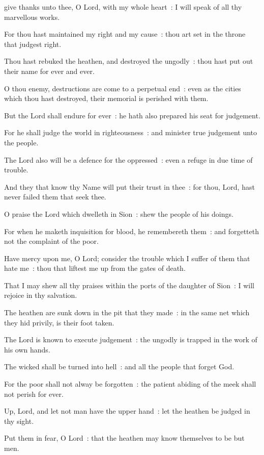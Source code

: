 give thanks unto thee, O Lord, with my whole heart~: I will speak of all thy marvellous works.\par
{}
For thou hast maintained my right and my cause~: thou art set in the throne that judgest right.\par
{}Thou hast rebuked the heathen, and destroyed the ungodly~: thou hast put out their name for ever and ever.\par
{}O thou enemy, destructions are come to a perpetual end~: even as the cities which thou hast destroyed, their memorial is perished with them.\par
{}But the Lord shall endure for ever~: he hath also prepared his seat for judgement.\par
{}For he shall judge the world in righteousness~: and minister true judgement unto the people.\par
{}The Lord also will be a defence for the oppressed~: even a refuge in due time of trouble.\par
{}And they that know thy Name will put their trust in thee~: for thou, Lord, hast never failed them that seek thee.\par
{}O praise the Lord which dwelleth in Sion~: shew the people of his doings.\par
{}For when he maketh inquisition for blood, he remembereth them~: and forgetteth not the complaint of the poor.\par
{}Have mercy upon me, O Lord; consider the trouble which I suffer of them that hate me~: thou that liftest me up from the gates of death.\par
{}That I may shew all thy praises within the ports of the daughter of Sion~: I will rejoice in thy salvation.\par
{}The heathen are sunk down in the pit that they made~: in the same net which they hid privily, is their foot taken.\par
{}The Lord is known to execute judgement~: the ungodly is trapped in the work of his own hands.\par
{}The wicked shall be turned into hell~: and all the people that forget God.\par
{}For the poor shall not alway be forgotten~: the patient abiding of the meek shall not perish for ever.\par
{}Up, Lord, and let not man have the upper hand~: let the heathen be judged in thy sight.\par
{}Put them in fear, O Lord~: that the heathen may know themselves to be but men.\par

